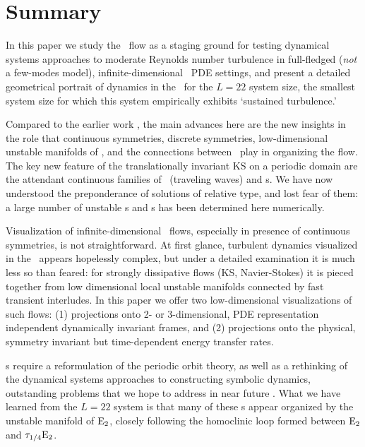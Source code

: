 
\section{Summary}
\label{sect:rpo-sum}

In this paper we study the \KS\ flow as a staging ground for
testing dynamical systems approaches to
moderate Reynolds number turbulence in full-fledged
({\em not} a few-modes model),
infinite-dimensional \statesp\ PDE settings,
and present a detailed geometrical portrait of dynamics in the
{\KS} \statesp\ for the $L=22$ system size, the smallest
system size for which this system empirically exhibits
`sustained turbulence.'

Compared to the earlier work
,
the main advances here are the new insights in
the role that continuous symmetries,
discrete symmetries,
low-dimensional unstable manifolds of \eqva,
and the connections between \eqva\ play in organizing the flow.
The key new feature of the translationally invariant KS
on a periodic domain
are the attendant continuous families of
\reqva\ (traveling waves) and \rpo s.
We have now understood the preponderance of solutions of
relative type, and lost fear of them:
a large number of unstable \rpo s and \po s has been determined
here numerically.

Visualization of infinite-dimensional
\statesp\ flows, especially in presence of continuous symmetries,
is not straightforward.
At first glance, turbulent dynamics visualized in the \statesp\ appears
hopelessly complex, but under a detailed examination it is
much less so than feared: for strongly dissipative flows (KS, Navier-Stokes)
it is pieced together from low dimensional
local unstable manifolds connected by fast transient interludes.
In this paper we offer two low-dimensional visualizations of such
flows: (1) projections onto 2- or 3-dimensional,
PDE representation independent
dynamically invariant frames, and
(2) projections onto
the physical, symmetry invariant but time-dependent
energy transfer rates.

\Rpo s require a reformulation of the periodic orbit
theory, as well as a rethinking of the dynamical
systems approaches to constructing symbolic dynamics,
outstanding problems that we hope to address in near future
.
What we have learned from the $L=22$ system  is that many of
these \rpo s appear organized by the unstable manifold of
$\mathrm{E}_{2}$, closely following the homoclinic loop formed
between $\mathrm{E}_{2}$ and $\tau_{1/4}\mathrm{E}_{2}$.

